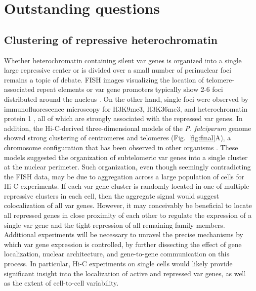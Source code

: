 \section{Outstanding questions}

\subsection{Clustering of repressive heterochromatin}

Whether heterochromatin containing silent var genes is organized into a single
large repressive center or is divided over a small number of perinuclear foci
remains a topic of debate. FISH images visualizing the location of
telomere-associated repeat elements or var gene promoters typically show 2-6
foci distributed around the nucleus \citep{lopez-rubio:genome-wide,
freitas-junior:frequent, ralph:antigenic, voss:var}. On the other hand, single
foci were observed by immunofluorescence microscopy for H3K9me3, H3K36me3, and
heterochromatin protein 1 \citep{ukaegbu:recruitment, dahan:pfsec13},
all of which are strongly associated with
the repressed var genes. In addition, the Hi-C-derived three-dimensional
models of the \textit{P. falciparum} genome showed strong clustering of centromeres and
telomeres \citep{ay:three-dimensional} (Fig.~\ref{fig:final}A), a
chromosome configuration that has been observed in
other organisms \citep{duan:three-dimensional, tanizawa:mapping,
umbarger:three-dimensional}. These models suggested the organization of
subtelomeric var genes into a single cluster at the nuclear perimeter. Such
organization, even though seemingly contradicting the FISH data, may be due to
aggregation across a large population of cells for Hi-C experiments. If each
var gene cluster is randomly located in one of multiple repressive clusters in
each cell, then the aggregate signal would suggest colocalization of all var
genes. However, it may conceivably be beneficial to locate all repressed genes
in close proximity of each other to regulate the expression of a single var
gene and the tight repression of all remaining family members. Additional
experiments will be necessary to unravel the precise mechanisms by which var
gene expression is controlled, by further dissecting the effect of gene
localization, nuclear architecture, and gene-to-gene communication on this
process. In particular, Hi-C experiments on single cells would likely provide
significant insight into the localization of active and repressed var genes,
as well as the extent of cell-to-cell variability. 

